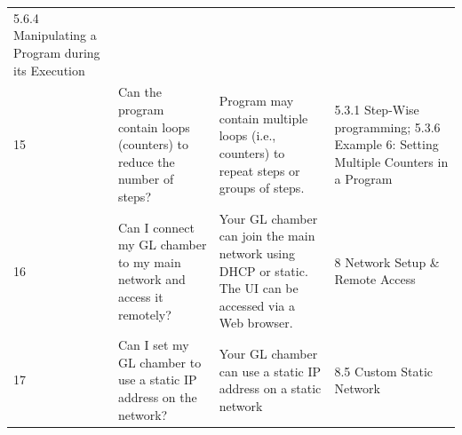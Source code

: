 \begin{longtable}[]{@{}|l|l|l|l|@{}}
\begin{minipage}[t]{0.17\columnwidth}
5.6.4 Manipulating a Program during its Execution\strut
\end{minipage}\tabularnewline
 \begin{minipage}[t]{0.08\columnwidth}\raggedright
15\strut
\end{minipage} & \begin{minipage}[t]{0.30\columnwidth}\raggedright
Can the program contain loops (counters) to reduce the number of
steps?\strut
\end{minipage} & \begin{minipage}[t]{0.33\columnwidth}\raggedright
Program may contain multiple loops (i.e., counters) to repeat steps or
groups of steps.\strut
\end{minipage} & \begin{minipage}[t]{0.17\columnwidth}\raggedright
5.3.1 Step-Wise programming; 5.3.6 Example 6: Setting Multiple Counters
in a Program\strut
\end{minipage}\tabularnewline
 \begin{minipage}[t]{0.08\columnwidth}\raggedright
16\strut
\end{minipage} & \begin{minipage}[t]{0.30\columnwidth}\raggedright
Can I connect my GL chamber to my main network and access it
remotely?\strut
\end{minipage} & \begin{minipage}[t]{0.33\columnwidth}\raggedright
Your GL chamber can join the main network using DHCP or static. The UI
can be accessed via a Web browser.\strut
\end{minipage} & \begin{minipage}[t]{0.17\columnwidth}\raggedright
8 Network Setup \& Remote Access\strut
\end{minipage}\tabularnewline
 \begin{minipage}[t]{0.08\columnwidth}\raggedright
17\strut
\end{minipage} & \begin{minipage}[t]{0.30\columnwidth}\raggedright
Can I set my GL chamber to use a static IP address on the network?\strut
\end{minipage} & \begin{minipage}[t]{0.33\columnwidth}\raggedright
Your GL chamber can use a static IP address on a static network\strut
\end{minipage} & \begin{minipage}[t]{0.17\columnwidth}\raggedright
8.5 Custom Static Network\strut
\end{minipage}\tabularnewline

\end{longtable}
